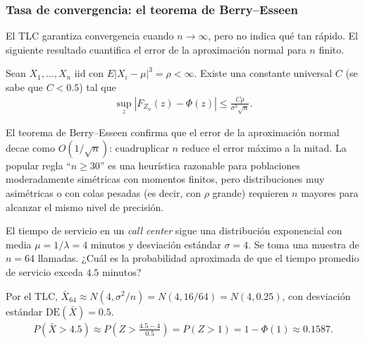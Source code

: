 \subsubsection{Tasa de convergencia: el teorema de Berry--Esseen}

El TLC garantiza convergencia cuando $n \to \infty$, pero no indica qu\'e tan
r\'apido. El siguiente resultado cuantifica el error de la aproximaci\'on normal
para $n$ finito.

\begin{teorema}
 \label{eq:5.2.2}
Sean $X_1,\ldots,X_n$ iid con $E|X_i-\mu|^3 = \rho < \infty$. Existe una constante
universal $C$ (se sabe que $C < 0.5$) tal que
\begin{align}
 \sup_z \left|F_{Z_n}(z) - \Phi(z)\right| \le \frac{C\rho}{\sigma^3\sqrt{n}}.
\end{align}
\end{teorema}

\begin{observacion}
El teorema de Berry--Esseen confirma que el error de la aproximaci\'on normal
decae como $O(1/\sqrt{n})$: cuadruplicar $n$ reduce el error m\'aximo a la mitad.
La popular regla ``$n \ge 30$'' es una heur\'istica razonable para poblaciones
moderadamente sim\'etricas con momentos finitos, pero distribuciones muy
asim\'etricas o con colas pesadas (es decir, con $\rho$ grande) requieren $n$
mayores para alcanzar el mismo nivel de precisi\'on.
\end{observacion}

\begin{ejemplo}
 \label{exmp:5.2.1}
El tiempo de servicio en un \emph{call center} sigue una distribuci\'on
exponencial con media $\mu = 1/\lambda = 4$ minutos y desviaci\'on est\'andar
$\sigma = 4$. Se toma una muestra de $n=64$ llamadas. ¿Cu\'al es la probabilidad
aproximada de que el tiempo promedio de servicio exceda $4.5$ minutos?
\end{ejemplo}

\begin{solucion}
Por el TLC, $\bar{X}_{64} \approx N(4, \sigma^2/n) = N(4, 16/64) = N(4, 0.25)$, con
desviaci\'on est\'andar $\text{DE}(\bar{X}) = 0.5$.
\begin{align}
 P(\bar{X} > 4.5) \approx P\!\left(Z > \frac{4.5-4}{0.5}\right) = P(Z>1) = 1-\Phi(1)
 \approx 0.1587.
\end{align}
\end{solucion}



